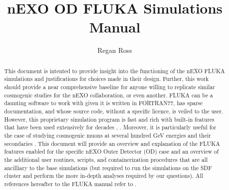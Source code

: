 \documentclass[10pt]{article}
\title{nEXO OD FLUKA Simulations Manual}
\author{Regan Ross}
\begin{document}
\begin{titlepage}
    \maketitle
    \vspace{4cm}
    \centering
\end{titlepage}

\begin{abstract}
    This document is intented to provide insight into the functioning of the nEXO FLUKA simulations and justifications for choices made in their design. Further, this work should provide a near comprehensive baseline for anyone willing to replicate similar cosmogenic studies for the nEXO collaboration, or even another. FLUKA can be a daunting software to work with given it is written in FORTRAN77, has sparse documentation, and whose source code, without a specific licence, is veiled to the user. However, this proprietary simulation program is fast and rich with built-in features that have been used extensively for decades \cite{FLUKA1}, \cite{FLUKA2}. Moreover, it is particularly useful for the case of studying cosmogenic muons at several hundred GeV energies and their secondaries \cite{gratta_muons_to_neutrons} \cite{KamLand_Zen}. This document will provide an overview and explanation of the FLUKA features enabled for the specific nEXO Outer Detector (OD) case and an overview of the additional user routines, scripts, and containerization procedures that are all ancilliary to the base simulations (but required to run the simulations on the SDF cluster and perform the more in-depth analyses required by our questions).  All references hereafter to the FLUKA manual refer to \cite{FLUKA_Manual}.


\end{abstract}

\vspace{1.5cm}
\listoffigures

\newpage
\tableofcontents

\break

\end{document}
